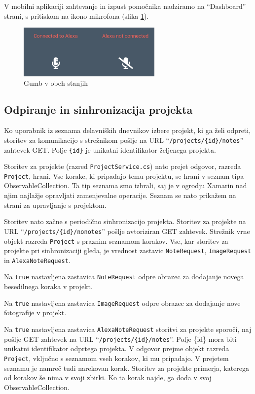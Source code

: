 \documentclass[a4paper, 12pt]{book}
\begin{document}
V mobilni aplikaciji zahtevanje in izpust pomočnika nadziramo na \enquote{Dashboard} strani, s pritiskom na ikono mikrofona (slika \ref{app_alexa_yesno}).

\begin{figure}[H]
\begin{center}
\includegraphics[width=7cm]{app_alexa_yesno}
\end{center}
	\caption{Gumb v obeh stanjih}
\label{app_alexa_yesno}
\end{figure}

\subsection{Odpiranje in sinhronizacija projekta}

Ko uporabnik iz seznama delavniških dnevnikov izbere projekt, ki ga želi odpreti, storitev za komunikacijo s strežnikom pošlje na URL \enquote{\texttt{/projects/\{id\}/notes}} zahtevek GET.
Polje \texttt{\{id\}} je unikatni identifikator željenega projekta.

Storitev za projekte (razred \texttt{ProjectService.cs}) nato prejet odgovor, razreda \texttt{Project}, hrani.
Vse korake, ki pripadajo temu projektu, se hrani v seznam tipa ObservableCollection.
Ta tip seznama smo izbrali, saj je v ogrodju Xamarin nad njim najlažje opravljati zamenjevalne operacije.
Seznam se nato prikažem na strani za upravljanje s projektom.

Storitev nato začne s periodično sinhronizacijo projekta.
Storitev za projekte na URL \enquote{\texttt{/projects/\{id\}/nonotes}} pošlje avtoriziran GET zahtevek.
Strežnik vrne objekt razreda \texttt{Project} s praznim seznamom korakov.
Vse, kar storitev za projekte pri sinhronizaciji gleda, je vrednost zastavic \texttt{NoteRequest}, \texttt{ImageRequest} in \texttt{AlexaNoteRequest}.

Na \texttt{true} nastavljena zastavica \texttt{NoteRequest} odpre obrazec za dodajanje novega besedilnega koraka v projekt.

Na \texttt{true} nastavljena zastavica \texttt{ImageRequest} odpre obrazec za dodajanje nove fotografije v projekt.

Na \texttt{true} nastavljena zastavica \texttt{AlexaNoteRequest} storitvi za projekte sporoči, naj pošlje GET zahtevek na URL \enquote{\texttt{/projects/\{id\}/notes}}.
Polje \{id\} mora biti unikatni identifikator odprtega projekta.
V odgovor prejme objekt razreda \texttt{Project}, vključno s seznamom vseh korakov, ki mu pripadajo.
V prejetem seznamu je namreč tudi narekovan korak.
Storitev za projekte primerja, katerega od korakov še nima v svoji zbirki.
Ko ta korak najde, ga doda v svoj ObservableCollection.
\end{document}
